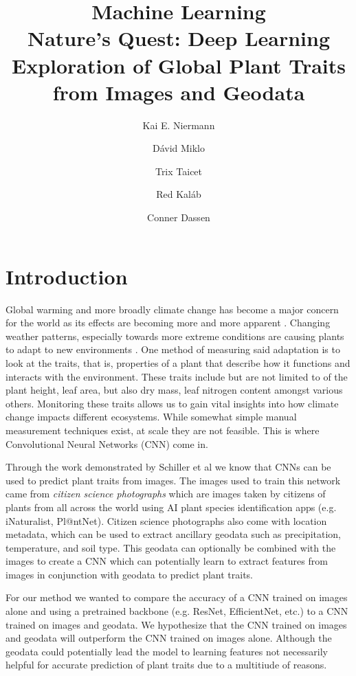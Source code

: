 \documentclass[12pt,a4paper,oneside]{article}
\title{
    \Huge{Machine Learning} \\ \LARGE 
    Nature's Quest: Deep Learning Exploration of Global Plant Traits from Images and Geodata
}
\author{
Kai E. Niermann \and
Dávid Miklo \and 
Trix Taicet \and
Red Kaláb \and
Conner Dassen
}
\date{\DTMusedate{date}}
\begin{document}
\maketitle

% 

\begin{abstract}
\end{abstract}

\section{Introduction}
Global warming and more broadly climate change has become a major concern for the world as its effects are becoming more and more apparent \cite{WANG2023100237}. Changing weather patterns, especially towards more extreme conditions are causing plants to adapt to new environments \cite{GRAY201664}. One method of measuring said adaptation is to look at the traits, that is, properties of a plant that describe how it functions and interacts with the environment. These traits include but are not limited to of the plant height, leaf area, but also dry mass, leaf nitrogen content amongst various others. Monitoring these traits allows us to gain vital insights into how climate change impacts different ecosystems. While somewhat simple manual measurement techniques exist, at scale they are not feasible. This is where Convolutional Neural Networks (CNN) come in.  

\smallskip
Through the work demonstrated by Schiller et al \cite{schiller2021deep} we know that CNNs can be used to predict plant traits from images. The images used to train this network came from \textit{citizen science photographs} which are images taken by citizens of plants from all across the world using AI plant species identification apps (e.g. iNaturalist, Pl@ntNet). Citizen science photographs also come with location metadata, which can be used to extract ancillary geodata such as precipitation, temperature, and soil type. This geodata can optionally be combined with the images to create a CNN which can potentially learn to extract features from images in conjunction with geodata to predict plant traits.

\smallskip
For our method we wanted to compare the accuracy of a CNN trained on images alone and using a pretrained backbone (e.g. ResNet, EfficientNet, etc.) to a CNN trained on images and geodata. We hypothesize that the CNN trained on images and geodata will outperform the CNN trained on images alone. Although the geodata could potentially lead the model to learning features not necessarily helpful for accurate prediction of plant traits due to a multitiude of reasons. 
\end{document}
